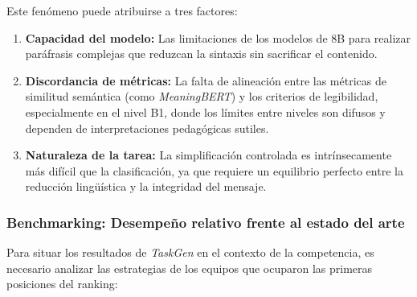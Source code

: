 Este fenómeno puede atribuirse a tres factores:
\begin{enumerate}
\item \textbf{Capacidad del modelo:} Las limitaciones de los modelos de 8B para realizar paráfrasis complejas que reduzcan la sintaxis sin sacrificar el contenido.
\item \textbf{Discordancia de métricas:} La falta de alineación entre las métricas de similitud semántica (como \textit{MeaningBERT}) y los criterios de legibilidad, especialmente en el nivel B1, donde los límites entre niveles son difusos  y dependen de interpretaciones pedagógicas sutiles.
\item \textbf{Naturaleza de la tarea:} La simplificación controlada es intrínsecamente más difícil que la clasificación, ya que requiere un equilibrio perfecto entre la reducción lingüística y la integridad del mensaje.
\end{enumerate}

\subsubsection*{Benchmarking: Desempeño relativo frente al estado del arte}

Para situar los resultados de \textit{TaskGen} en el contexto de la competencia, es necesario analizar las estrategias de los equipos que ocuparon las primeras posiciones del ranking:

